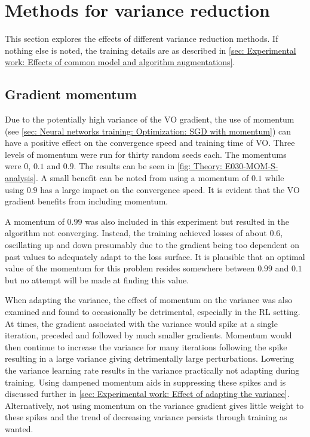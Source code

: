 
\section{Methods for variance reduction}
This section explores the effects of different variance reduction methods. If nothing else is noted, the training details are as described in \autoref{sec: Experimental work: Effects of common model and algorithm augmentations}.

\subsection{Gradient momentum}\label{sec: Experimental work: Effect of momentum}
Due to the potentially high variance of the \gls{VO} gradient, the use of momentum (see \autoref{sec: Neural networks training: Optimization: SGD with momentum}) can have a positive effect on the convergence speed and training time of \gls{VO}. Three levels of momentum were run for thirty random seeds each. The momentums were $0$, $0.1$ and $0.9$. The results can be seen in \autoref{fig: Theory: E030-MOM-S-analysis}. 
A small benefit can be noted from using a momentum of $0.1$ while using $0.9$ has a large impact on the convergence speed.
It is evident that the \gls{VO} gradient benefits from including momentum.

A momentum of $0.99$ was also included in this experiment but resulted in the algorithm not converging. Instead, the training achieved losses of about $0.6$, oscillating up and down presumably due to the gradient being too dependent on past values to adequately adapt to the loss surface. It is plausible that an optimal value of the momentum for this problem resides somewhere between $0.99$ and $0.1$ but no attempt will be made at finding this value.

When adapting the variance, the effect of momentum on the variance was also examined and found to occasionally be detrimental, especially in the \gls{RL} setting. At times, the gradient associated with the variance would spike at a single iteration, preceded and followed by much smaller gradients. Momentum would then continue to increase the variance for many iterations following the spike resulting in a large variance giving detrimentally large perturbations. Lowering the variance learning rate results in the variance practically not adapting during training. Using dampened momentum aids in suppressing these spikes and is discussed further in \autoref{sec: Experimental work: Effect of adapting the variance}. Alternatively, not using momentum on the variance gradient gives little weight to these spikes and the trend of decreasing variance persists through training as wanted.

